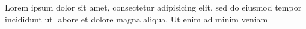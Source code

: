 \documentclass{article}
\begin{document}
{}

\begin{clozepar}
Lorem ipsum dolor sit amet, consectetur adipisicing elit, sed do eiusmod
tempor incididunt ut labore et dolore magna aliqua. Ut enim ad minim
veniam
\end{clozepar}
\end{document}
